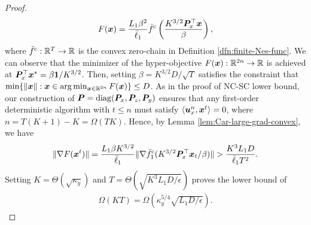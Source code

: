 \begin{proof}
\begin{align} \label{eq:varphi-sc}
      F({\bm{x}}) 
   = \frac{L_1 \beta^2}{\bar \ell_1} \bar f^{\rm c} \left(\frac{K^{3/2} {\bm{P}}_x^\top {\bm{x}}}{\beta}\right),
\end{align}
where $\bar f^{\rm c}: {\mathbb{R}}^T \rightarrow {\mathbb{R}}$ is the convex zero-chain in Definition \ref{dfn:finite-Nes-func}. We can observe that
the minimizer of 
the hyper-objective $F({\bm{x}}): {\mathbb{R}}^{2n} \rightarrow {\mathbb{R}}$ is achieved at ${\bm{P}}_x^\top {\bm{x}}^* = \beta {\bm{1}} / K^{3/2}$. Then, setting $\beta = {K^{3/2} D}/{\sqrt{T}}$ satisfies the constraint that
$\min\{ \Vert {\bm{x}} \Vert : {\bm{x}} \in  \arg \min_{{\bm{x}} \in {\mathbb{R}}^{2n}} F({\bm{x}})  \} \le D$.
As in the proof of NC-SC lower bound, our construction of ${\bm{P}} = {\rm diag}({\bm{P}}_x, {\bm{P}}_z, {\bm{P}}_y)$ ensures that 
any first-order deterministic algorithm with $t \le n$ must satisfy $\langle {\bm{u}}_x^n, {\bm{x}}^t \rangle  = 0$, where $n = T (K+1) - K = \Omega(TK)$. Hence, by Lemma \ref{lem:Car-large-grad-convex}, we have 
\begin{align*}
    \Vert \nabla F({\bm{x}}^t) \Vert = \frac{L_1 \beta K^{3/2} }{\bar \ell_1} \Vert \nabla \bar f^{\rm c}_1(K^{3/2} {\bm{P}}_x^\top {\bm{x}}_t/\beta) \Vert > \frac{K^{3}L_1 D}{\bar \ell_1 T^2}.
\end{align*}
Setting $K = \Theta(\sqrt{\kappa_y})$ and $T = \Theta( \sqrt{K^{3} L_1 D / \epsilon} )$ proves the lower bound of
\begin{align*}
    \Omega (K T) = \Omega\left( \kappa_y^{5/4} \sqrt{ L_1  D/ \epsilon} \right).
\end{align*}
\end{proof}

